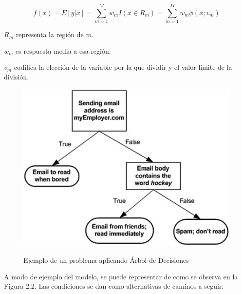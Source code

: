 \begin{Large}
	\begin{equation}
		f(x)=E[y|x]=\sum_{m=1}^{M}w_{m}I(x \in R_{m})=\sum_{m=1}^{M}w_{m}\phi(x;v_{m})
		\label{eq:Ecuación del Modelo Decision Tree}
	\end{equation}
\end{Large}
\par $R_{m}$ representa la región de $m$.
\par $w_{m}$ es respuesta media a esa región.
\par $v_{m}$ codifica la elección de la variable por la que dividir y el valor límite de la división.\\



\begin{figure}[H]
	\centering
	\includegraphics[scale=1.2]{img/Marco Teorico/arbol de desicion.png} 
	\label{fig:padt}
	\caption{Ejemplo de un problema aplicando Árbol de Decisiones}
\end{figure}

\par A modo de ejemplo del modelo, se puede representar de como se observa en la Figura 2.2. Las condiciones se dan como alternativas de caminos a seguir.\\

\doublespacing
